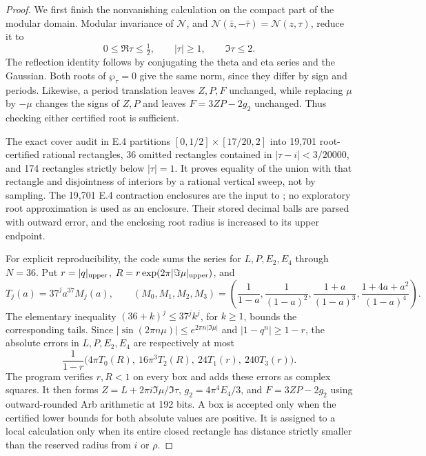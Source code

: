 \begin{proof}
We first finish the nonvanishing calculation on the compact part of
the modular domain. Modular invariance of \(\mathcal N\), and
\(\mathcal N(\bar z,-\bar\tau)=\mathcal N(z,\tau)\), reduce it to
\[
 0\leq\Re\tau\leq\tfrac12,\qquad |\tau|\geq1,
 \qquad \Im\tau\leq2.
\]
The reflection identity follows by conjugating the theta and eta
series and the Gaussian. Both roots of \(\wp_\tau=0\) give the
same norm, since they differ by sign and periods. Likewise, a period
translation leaves \(Z,P,F\) unchanged, while replacing \(\mu\)
by \(-\mu\) changes the signs of \(Z,P\) and leaves
\(F=3ZP-2g_2\) unchanged. Thus checking either certified root is
sufficient.

The exact cover audit in E.4 partitions
\([0,1/2]\times[17/20,2]\) into 19,701 root-certified rational
rectangles, 36 omitted rectangles contained in
\(|\tau-i|<3/20000\), and 174 rectangles strictly below
\(|\tau|=1\). It proves equality of the union with that rectangle
and disjointness of interiors by a rational vertical sweep, not by
sampling. The 19,701 E.4 contraction enclosures are the input to
; no exploratory root approximation
is used as an enclosure. Their stored decimal balls are parsed with
outward error, and the enclosing root radius is increased to its
upper endpoint.

For explicit reproducibility, the code sums the series for
\(L,P,E_2,E_4\) through \(N=36\). Put
\(r=|q|_{\rm upper}\),
\(R=r\exp(2\pi|\Im\mu|_{\rm upper})\), and
\[
 T_j(a)=37^j a^{37}M_j(a),\qquad
 (M_0,M_1,M_2,M_3)=
 \left(\frac1{1-a},\frac1{(1-a)^2},
 \frac{1+a}{(1-a)^3},\frac{1+4a+a^2}{(1-a)^4}\right).
\]
The elementary inequality \((36+k)^j\leq37^jk^j\), for
\(k\geq1\), bounds the corresponding tails. Since
\(|\sin(2\pi n\mu)|\leq e^{2\pi n|\Im\mu|}\) and
\(|1-q^n|\geq1-r\), the absolute errors in \(L,P,E_2,E_4\)
are respectively at most
\[
 \frac1{1-r}\bigl(
 4\pi T_0(R),\ 16\pi^3T_2(R),\
 24T_1(r),\ 240T_3(r)\bigr).
\]
The program verifies \(r,R<1\) on every box and adds these errors
as complex squares. It then forms
\(Z=L+2\pi i\Im\mu/\Im\tau\),
\(g_2=4\pi^4E_4/3\), and \(F=3ZP-2g_2\) using outward-rounded
Arb arithmetic at 192 bits. A box is accepted only when the
certified lower bounds for both absolute values are positive. It
is assigned to a local calculation only when its entire closed
rectangle has distance strictly smaller than the reserved radius
from \(i\) or \(\rho\).


\end{proof}
